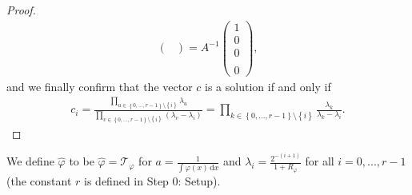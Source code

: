 \begin{proof}
\begin{align*}
\begin{pmatrix}
        \end{pmatrix}
        = A^{-1}\begin{pmatrix}
            1 \\ 0 \\ 0 \\ \\ 0
        \end{pmatrix},
    \end{align*}
    and we finally confirm that the vector $c$ is a solution if and only if  
    \begin{align*}
        c_i = \frac{\prod\limits_{u \in \left\{ 0,...,r-1 \right\} \setminus \left\{ i \right\} }\lambda_u}{\prod\limits_{v \in \left\{ 0,...,r-1 \right\} \setminus \left\{ i \right\}} (\lambda_v - \lambda_i)} = \prod\limits_{k \in \left\{ 0,...,r-1 \right\} \setminus \left\{ i \right\}} \frac{\lambda_k}{\lambda_k - \lambda_i}.
    \end{align*}
\end{proof}

We define $\hat \varphi$ to be $\hat \varphi = \mathcal{T}_{\varphi}$ for $a = \frac{1}{\int \varphi(x) \, \mathrm{d}x}$ and $\lambda_i = \frac{2^{-(i+1)}}{1+R_\varphi}$ for all $i = 0,...,r-1$ (the constant $r$ is defined in Step 0: Setup).   
    
